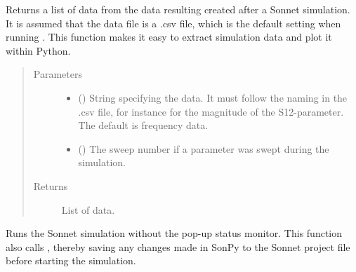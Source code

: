 \documentclass[letterpaper,10pt,english,openany]{sphinxmanual}
\begin{document}
\begin{fulllineitems}
\begin{fulllineitems}
\begin{quote}
\begin{description}
\begin{itemize}
\end{itemize}

\end{description}\end{quote}

\end{fulllineitems}


\begin{fulllineitems}
\label{\detokenize{source/sonpy:sonpy.sonnet.getOutput}}
Returns a list of data from the data resulting created after a Sonnet simulation. It is assumed that the data file is a .csv file, which is the default setting when running {\hyperref[\detokenize{source/sonpy:sonpy.sonnet.setOutput}]{}}. This function makes it easy to extract simulation data and plot it within Python.
\begin{quote}\begin{description}
\item[{Parameters}] \leavevmode\begin{itemize}
\item {} 
 () \textendash{} String specifying the data. It must follow the naming in the .csv file, for instance  for the magnitude of the S12-parameter. The default is frequency data.

\item {} 
 () \textendash{} The sweep number if a parameter was swept during the simulation.

\end{itemize}

\item[{Returns}] \leavevmode
List of data.

\end{description}\end{quote}

\end{fulllineitems}


\begin{fulllineitems}
\label{\detokenize{source/sonpy:sonpy.sonnet.runSimulation}}
Runs the Sonnet simulation without the pop-up status monitor. This function also calls {\hyperref[\detokenize{source/sonpy:sonpy.sonnet.printProject}]{}}, thereby saving any changes made in SonPy to the Sonnet project file before starting the simulation.


\end{fulllineitems}
\end{fulllineitems}
\end{document}
